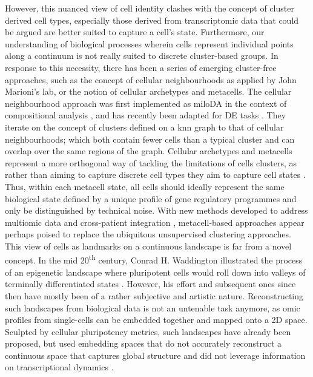 However, this nuanced view of cell identity clashes with the concept of cluster derived cell types, especially those derived from transcriptomic data that could be argued are better suited to capture a cell's state. Furthermore, our understanding of biological processes wherein cells represent individual points along a continuum is not really suited to discrete cluster-based groups. In response to this necessity, there has been a series of emerging cluster-free approaches, such as the concept of cellular neighbourhoods as applied by John Marioni's lab, or the notion of cellular archetypes and metacells. The cellular neighbourhood approach was first implemented as miloDA in the context of compositional analysis \cite{dann_differential_2022}, and has recently been adapted for DE tasks \cite{missarova_sensitive_2023}. They iterate on the concept of clusters defined on a \acrshort{knn} graph to that of cellular neighbourhoods; which both contain fewer cells than a typical cluster and can overlap over the same regions of the graph. Cellular archetypes and metacells represent a more orthogonal way of tackling the limitations of cells clusters, as rather than aiming to capture discrete cell types they aim to capture cell states \cite{baran_metacell_2019, wang_non-linear_2022}. Thus, within each metacell state, all cells should ideally represent the same biological state defined by a unique profile of gene regulatory programmes and only be distinguished by technical noise. With new methods developed to address multiomic data and cross-patient integration \cite{persad_seacells_2023}, metacell-based approaches appear perhaps poised to replace the ubiquitous unsupervised clustering approaches.  
This view of cells as landmarks on a continuous landscape is far from a novel concept. In the mid 20\textsuperscript{th} century, Conrad H. Waddington illustrated the process of an epigenetic landscape where pluripotent cells would roll down into valleys of terminally differentiated states \cite{ch_waddington_waddington_1957}. However, his effort and subsequent ones since then have mostly been of a rather subjective and artistic nature. Reconstructing such landscapes from biological data is not an untenable task anymore, as omic profiles from single-cells can be embedded together and mapped onto a 2D space. Sculpted by cellular pluripotency metrics, such landscapes have already been proposed, but used embedding spaces that do not accurately reconstruct a continuous space that captures global structure and did not leverage information on transcriptional dynamics \cite{chen_single-cell_2019}. 

